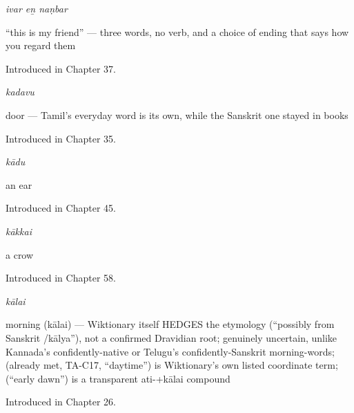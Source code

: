 \noindent\begin{minipage}[t]{\linewidth}
\raggedright
\textbf{  }\enspace\emph{ivar eṉ naṇbar}\par
\small \textquotedblleft{}this is my friend\textquotedblright{} — three words, no verb, and a choice of ending that says how you regard them\par
\footnotesize Introduced in Chapter 37.
\end{minipage}\par\medskip

\noindent\begin{minipage}[t]{\linewidth}
\raggedright
\textbf{}\enspace\emph{kadavu}\par
\small door — Tamil's everyday word is its own, while the Sanskrit one stayed in books\par
\footnotesize Introduced in Chapter 35.
\end{minipage}\par\medskip

\noindent\begin{minipage}[t]{\linewidth}
\raggedright
\textbf{}\enspace\emph{kādu}\par
\small an ear\par
\footnotesize Introduced in Chapter 45.
\end{minipage}\par\medskip

\noindent\begin{minipage}[t]{\linewidth}
\raggedright
\textbf{}\enspace\emph{kākkai}\par
\small a crow\par
\footnotesize Introduced in Chapter 58.
\end{minipage}\par\medskip

\noindent\begin{minipage}[t]{\linewidth}
\raggedright
\textbf{}\enspace\emph{kālai}\par
\small morning (kālai) — Wiktionary itself HEDGES the etymology (\textquotedblleft{}possibly from Sanskrit /kālya\textquotedblright{}), not a confirmed Dravidian root; genuinely uncertain, unlike Kannada's confidently-native or Telugu's confidently-Sanskrit morning-words;  (already met, TA-C17, \textquotedblleft{}daytime\textquotedblright{}) is Wiktionary's own listed coordinate term;  (\textquotedblleft{}early dawn\textquotedblright{}) is a transparent ati-+kālai compound\par
\footnotesize Introduced in Chapter 26.
\end{minipage}\par\medskip

